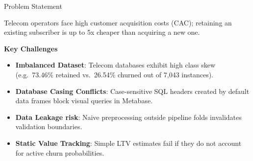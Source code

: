 \documentclass{beamer}
\begin{document}
\begin{frame}{Problem Statement}

Telecom operators face high customer acquisition costs (CAC); retaining an existing subscriber is up to 5x cheaper than acquiring a new one.

\vspace{2pt}
\textbf{Key Challenges}
\begin{itemize}
    \item \textbf{Imbalanced Dataset}: Telecom databases exhibit high class skew (e.g.\ 73.46\% retained vs.\ 26.54\% churned out of 7,043 instances).
    \item \textbf{Database Casing Conflicts}: Case-sensitive SQL headers created by default data frames block visual queries in Metabase.
    \item \textbf{Data Leakage risk}: Naive preprocessing outside pipeline folds invalidates validation boundaries.
    \item \textbf{Static Value Tracking}: Simple LTV estimates fail if they do not account for active churn probabilities.
\end{itemize}

\end{frame}
\end{document}
